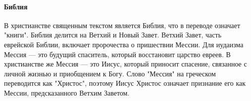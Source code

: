 \paragraph{Библия}


В христианстве священным текстом является Библия, что в переводе означает "книги". Библия делится на Ветхий и Новый Завет. Ветхий Завет, часть еврейской Библии, включает пророчества о пришествии Мессии. Для иудаизма Мессия — это будущий спаситель, который восстановит царство евреев. В христианстве же Мессия — это Иисус, который приносит спасение, связанное с личной жизнью и приобщением к Богу. Слово "Мессия" на греческом переводится как "Христос", поэтому Иисус Христос означает признание его как Мессии, предсказанного Ветхим Заветом.

